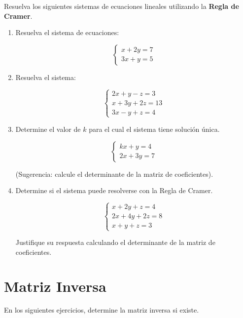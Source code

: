 \documentclass[12pt,letterpaper]{article}
\begin{document}
Resuelva los siguientes sistemas de ecuaciones lineales utilizando la \textbf{Regla de Cramer}.

\begin{enumerate}


\item Resuelva el sistema de ecuaciones:

\[
\begin{cases}
x + 2y = 7 \\
3x + y = 5
\end{cases}
\]


\item Resuelva el sistema:

\[
\begin{cases}
2x + y - z = 3 \\
x + 3y + 2z = 13 \\
3x - y + z = 4
\end{cases}
\]

\item Determine el valor de $k$ para el cual el sistema tiene solución única.

\[
\begin{cases}
kx + y = 4 \\
2x + 3y = 7
\end{cases}
\]

(Sugerencia: calcule el determinante de la matriz de coeficientes).

\item Determine si el sistema puede resolverse con la Regla de Cramer.

\[
\begin{cases}
x + 2y + z = 4 \\
2x + 4y + 2z = 8 \\
x + y + z = 3
\end{cases}
\]

Justifique su respuesta calculando el determinante de la matriz de coeficientes.

\end{enumerate}
\vspace{0.3cm}
\section*{Matriz Inversa}

En los siguientes ejercicios, determine la matriz inversa si existe.
\end{document}
